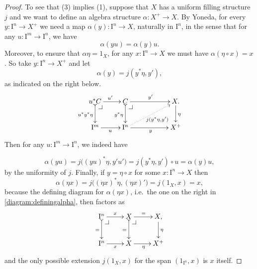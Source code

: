 \documentclass[11pt,reqno]{amsart}
\makeatletter
\newcommand{\ra}{\ensuremath{\rightarrow}}
\newcommand{\I}{\ensuremath{\mathrm{I}}}
\theoremstyle{remark}
\theoremstyle{definition}
\newcommand{\pbcorner}[1][dr]{\save*!/#1-1.2pc/#1:(-1,1)@^{|-}\restore}
\makeatother
\begin{document}
\begin{proof}
To see that (3) implies (1), suppose that $X$ has a uniform filling structure $j$ and we want to define an algebra structure $\alpha : X^+ \ra X$. By Yoneda, for every $y : \I^n \ra X^+$ we need a map $\alpha(y) : \I^n \ra X$, naturally in $\I^n$, in the sense that for any $u : \I^m \ra \I^n$, we have
\begin{equation}\label{eq:proof,plusstructure}
\alpha(yu) = \alpha(y)u.
\end{equation}
Moreover, to ensure that $\alpha\eta = 1_X$, for any $x : \I^n \ra X$ we must have $\alpha(\eta\circ x) = x$. So take $y : \I^n \ra X^+$  and let 
\[
\alpha(y) = j(y^*\eta, y'),
\]
as indicated on the right below.
\begin{equation}\label{diagram:definingalpha}
\xymatrix{
u^*C \ar@{>->}[d]_{u^*y^*\eta} \ar[r]^{u'} \pbcorner &  C \ar@{>->}[d]_{y^*\eta} \ar[rr]^{y'}\pbcorner && X \ar[d]^\eta . \\
\I^{m} \ar[r]_{u} & \I^{n} \ar@{.>}[rru]_{j(y^*\eta,y')} \ar[rr]_{y} && X^+
}
\end{equation}
Then for any $u : \I^m \ra \I^n$, we indeed have 

\[
\alpha(yu) =  j\big( (yu)^*\eta, y'u' \big) = j(y^*\eta, y')\circ u = \alpha(y)u,
\]
 by the uniformity of $j$. Finally, if $y=\eta\circ x$ for some $x : \I^n\ra X$ then 
 \[
 \alpha(\eta x) =  j\big( (\eta x)^*\eta, (\eta x)'\big) = j(1_X, x) = x,
 \]
 because the defining diagram for $\alpha(\eta x)$, i.e.\ the one on the right in \eqref{diagram:definingalpha}, then factors as
 \begin{equation}\label{diagram:definingalphatwo}
\xymatrix{
\I^n \ar@{>->}[d]_{=} \ar[r]^{x} \pbcorner &  X \ar@{>->}[d]_{=} \ar[r]^{=}\pbcorner & X \ar[d]^\eta , \\
\I^{n} \ar[r]_{x} & X  \ar[r]_{\eta} & X^+
}
\end{equation}
and the only possible extension $j(1_X, x)$ for the span $(1_{\I^n}, x)$ is  $x$ itself.
 \end{proof}
 
\end{document}
